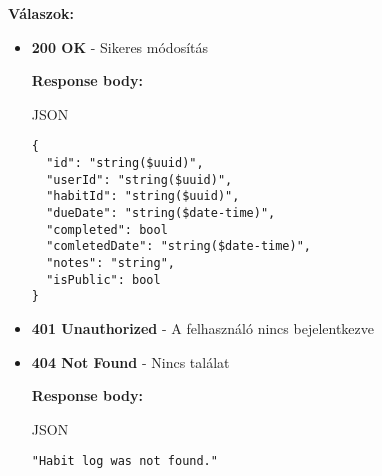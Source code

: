 \documentclass[12pt]{report}
\begin{document}
\begin{description}
    \vspace{0.5cm}
    \textbf{Válaszok:}
    \begin{itemize}
      \item \textbf{200 OK} - Sikeres módosítás

        \textbf{Response body:}
        \begin{codeblock}{JSON}
          \begin{verbatim}
{
  "id": "string($uuid)",
  "userId": "string($uuid)",
  "habitId": "string($uuid)",
  "dueDate": "string($date-time)",
  "completed": bool
  "comletedDate": "string($date-time)",
  "notes": "string",
  "isPublic": bool
}
          \end{verbatim}
        \end{codeblock}

      \item \textbf{401 Unauthorized} - A felhasználó nincs bejelentkezve

      \item \textbf{404 Not Found} - Nincs találat

        \textbf{Response body:}
        \begin{codeblock}{JSON}
          \begin{verbatim} 
"Habit log was not found."
          \end{verbatim}
        \end{codeblock}
    \end{itemize}
\end{description}
\end{document}
